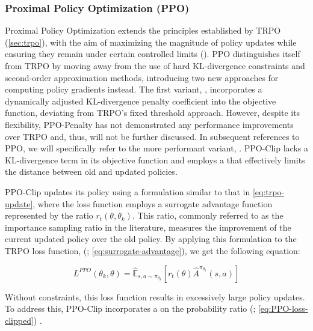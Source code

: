         \subsubsection{Proximal Policy Optimization (PPO)}
        \label{sec:ppo}

            \noindent Proximal Policy Optimization extends the principles established by TRPO (\autoref{sec:trpo}), with the aim of maximizing the magnitude of policy updates while ensuring they remain under certain controlled limits (\textcolor{deepblue}{\cite{schulman2017proximal}}). PPO distinguishes itself from TRPO by moving away from the use of hard KL-divergence constraints and second-order approximation methods, introducing two new approaches for computing policy gradients instead. The first variant, , incorporates a dynamically adjusted KL-divergence penalty coefficient into the objective function, deviating from TRPO's fixed threshold approach. However, despite its flexibility, PPO-Penalty has not demonstrated any performance improvements over TRPO and, thus, will not be further discussed. In subsequent references to PPO, we will specifically refer to the more performant variant, . PPO-Clip lacks a KL-divergence term in its objective function and employs a  that effectively limits the distance between old and updated policies.
            
            \bigskip
            
            \noindent PPO-Clip updates its policy using a formulation similar to that in \textcolor{deepblue}{\autoref{eq:trpo-update}}, where the loss function employs a surrogate advantage function represented by the ratio $r_t(\theta, \theta_k)$. This ratio, commonly referred to as the importance sampling ratio in the literature, measures the improvement of the current updated policy over the old policy. By applying this formulation to the TRPO loss function, (\textcolor{deepblue}{\cite{schulman2017proximal}; \autoref{eq:surrogate-advantage}}), we get the following equation:
            
            \begin{equation}
                L^{PPO}(\theta_k, \theta) = \mathbb{\hat{E}}_{s, a \sim \pi_{\theta_k}} \left [ r_t(\theta) \hat{A}^{\pi_{\theta_k}}(s, a)\right]
                \label{eq:PPO-loss}
            \end{equation}
            
            
            \noindent Without constraints, this loss function results in excessively large policy updates. To address this, PPO-Clip incorporates a  on the probability ratio (\textcolor{deepblue}{\cite{schulman2017proximal}; \autoref{eq:PPO-loss-clipped}}) \protect\footnotemark.
            
